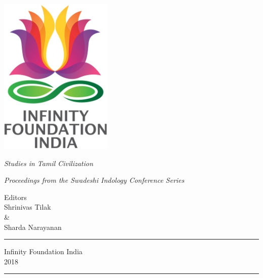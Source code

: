 \thispagestyle{empty}
\begin{center}
\includegraphics[scale=0.3]{images/logo.png}
\bigskip

{\fontsize{10}{14}\selectfont\sl
Studies in Tamil Civilization
}

\bigskip
\end{center}
\medskip

\begin{center}
{\fontsize{20}{24}\selectfont {L\,a\,n\,d\;\; o\,f\;\; D\,h\,a\,r\,m\,a}}
\bigskip

{\sl\small Proceedings from the Swadeshi Indology Conference Series}
\vfill


{\fontsize{14}{18}\selectfont 
Editors\\[2pt]
Shrinivas Tilak\\ 
\&\\ 
Sharda Narayanan\par
}
\vfill

\rule{5cm}{1pt}

{\fontsize{12}{14}\selectfont
Infinity Foundation India\\[4pt]
2018}

\rule{5cm}{1pt}
\end{center}




